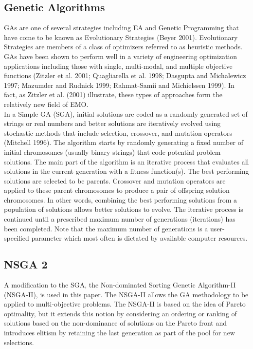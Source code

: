 \documentclass[12pt]{article} %
\begin{document}
\subsection{Genetic Algorithms }
GAs are one of several strategies including EA and Genetic Programming that have come to be known as Evolutionary Strategies (Beyer 2001). Evolutionary Strategies are members of a class of optimizers referred to as heuristic methods. GAs have been shown to perform well in a variety of engineering optimization applications including those with single, multi-modal, and multiple objective functions (Zitzler et al. 2001; Quagliarella et al. 1998; Dasgupta and Michalewicz 1997; Mazumder and Rudnick 1999; Rahmat-Samii and Michielssen 1999). In fact, as Zitzler et al. (2001) illustrate, these types of approaches form the relatively new field of EMO.\\
In a Simple GA (SGA), initial solutions are coded as a randomly generated set of strings or real numbers and better solutions are iteratively evolved using stochastic methods that include selection, crossover, and mutation operators (Mitchell 1996). The algorithm starts by randomly generating a fixed number of initial chromosomes (usually binary strings) that code potential problem solutions. The main part of the algorithm is an iterative process that evaluates all solutions in the current generation with a fitness function(s). The best performing solutions are selected to be parents. Crossover and mutation operators are applied to these parent chromosomes to produce a pair of offspring solution chromosomes. In other words, combining the best performing solutions from a population of solutions allows better solutions to evolve. The iterative process is continued until a prescribed maximum number of generations (iterations) has been completed. Note that the maximum number of generations is a user-specified parameter which most often is dictated by available computer resources.\\
\subsection{NSGA 2}
A modification to the SGA, the Non-dominated Sorting Genetic Algorithm-II (NSGA-II), is used in this paper. The NSGA-II allows the GA methodology to be applied to multi-objective problems. The NSGA-II is based on the idea of Pareto optimality, but it extends this notion by considering an ordering or ranking of solutions based on the non-dominance of solutions on the Pareto front and introduces elitism by retaining the last generation as part of the pool for new selections. \\[.25cm]
\end{document}
